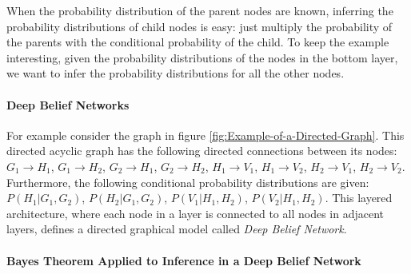 When the probability distribution of the parent nodes are known, inferring
the probability distributions of child nodes is easy: just multiply
the probability of the parents with the conditional probability of
the child. To keep the example interesting, given the probability
distributions of the nodes in the bottom layer, we want to infer the
probability distributions for all the other nodes.

\paragraph{Deep Belief Networks}

For example consider the graph in figure \vref{fig:Example-of-a-Directed-Graph}.
This directed acyclic graph has the following directed connections
between its nodes: $G_{1}\rightarrow H_{1}$, $G_{1}\rightarrow H_{2}$,
$G_{2}\rightarrow H_{1}$, $G_{2}\rightarrow H_{2}$, $H_{1}\rightarrow V_{1}$,
$H_{1}\rightarrow V_{2}$, $H_{2}\rightarrow V_{1}$, $H_{2}\rightarrow V_{2}$.
Furthermore, the following conditional probability distributions are
given: $P(H_{1}|G_{1},G_{2})$, $P(H_{2}|G_{1},G_{2})$, $P(V_{1}|H_{1},H_{2})$,
$P(V_{2}|H_{1},H_{2})$. This layered architecture, where each node
in a layer is connected to all nodes in adjacent layers, defines a
directed graphical model called \emph{Deep Belief Network}.

\paragraph{Bayes Theorem Applied to Inference in a Deep Belief Network}

